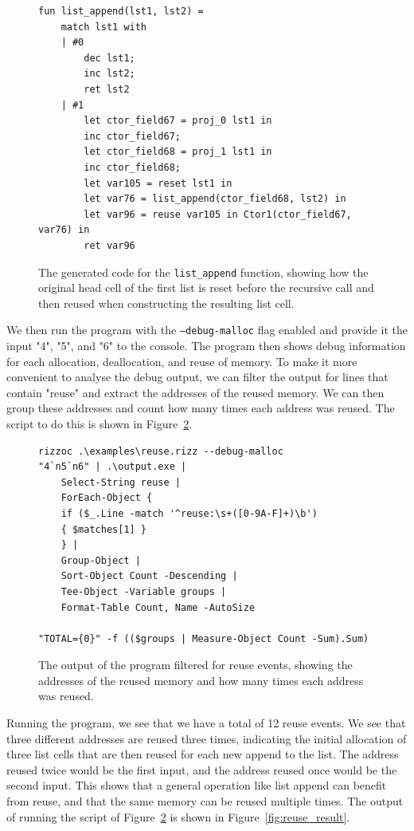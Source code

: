 \begin{figure}
\begin{lstlisting}
fun list_append(lst1, lst2) =
    match lst1 with
    | #0
        dec lst1;
        inc lst2;
        ret lst2
    | #1
        let ctor_field67 = proj_0 lst1 in
        inc ctor_field67;
        let ctor_field68 = proj_1 lst1 in
        inc ctor_field68;
        let var105 = reset lst1 in
        let var76 = list_append(ctor_field68, lst2) in
        let var96 = reuse var105 in Ctor1(ctor_field67, var76) in
        ret var96
\end{lstlisting}
\caption{The generated code for the \texttt{list\_append} function, showing how the original head cell of the first list is reset before the recursive call and then reused when constructing the resulting list cell.}
\label{figure:reuse_list_append}
\end{figure}

We then run the program with the \texttt{--debug-malloc} flag enabled and provide it the input "4", "5", and "6" to the console. The program then shows debug information for each allocation, deallocation, and reuse of memory. To make it more convenient to analyse the debug output, we can filter the output for lines that contain "reuse" and extract the addresses of the reused memory. We can then group these addresses and count how many times each address was reused. The script to do this is shown in Figure~\ref{fig:reuse_run_script}.

\begin{figure}
    \begin{verbatim}
rizzoc .\examples\reuse.rizz --debug-malloc
"4`n5`n6" | .\output.exe |
    Select-String reuse |
    ForEach-Object {
    if ($_.Line -match '^reuse:\s+([0-9A-F]+)\b') 
    { $matches[1] }
    } |
    Group-Object |
    Sort-Object Count -Descending |
    Tee-Object -Variable groups |
    Format-Table Count, Name -AutoSize

"TOTAL={0}" -f (($groups | Measure-Object Count -Sum).Sum)
\end{verbatim}
    \caption{The output of the program filtered for reuse events, showing the addresses of the reused memory and how many times each address was reused.}
    \label{fig:reuse_run_script}
\end{figure}

Running the program, we see that we have a total of 12 reuse events. We see that three different addresses are reused three times, indicating the initial allocation of three list cells that are then reused for each new append to the list. The address reused twice would be the first input, and the address reused once would be the second input. This shows that a general operation like list append can benefit from reuse, and that the same memory can be reused multiple times. The output of running the script of Figure~\ref{fig:reuse_run_script} is shown in Figure~\ref{fig:reuse_result}.

